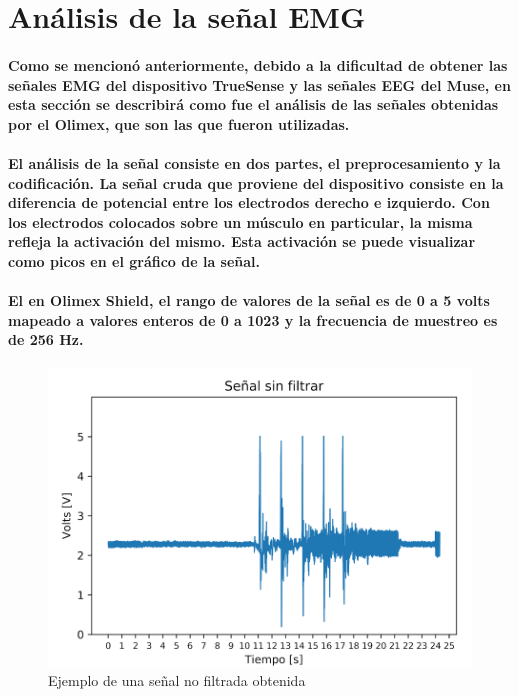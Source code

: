 \documentclass{article}
\begin{document}
\section{Análisis de la señal EMG}
\paragraph{
Como se mencionó anteriormente, debido a la dificultad de obtener las señales EMG del dispositivo TrueSense y las señales EEG del Muse, en esta sección se describirá como fue el análisis de las señales obtenidas por el Olimex, que son las que fueron utilizadas.
}
\paragraph{
El análisis de la señal consiste en dos partes, el preprocesamiento y la codificación. La señal cruda que proviene del dispositivo consiste en la diferencia de potencial entre los electrodos derecho e izquierdo. Con los electrodos colocados sobre un músculo en particular, la misma refleja la activación del mismo. Esta activación se puede visualizar como picos en el gráfico de la señal.
}
\paragraph{
El en Olimex Shield, el rango de valores de la señal es de 0 a 5 volts mapeado a valores enteros de 0 a 1023 y la frecuencia de muestreo es de 256 Hz.
}

\begin{figure}[ht]
    \centering
    \includegraphics[width=\textwidth]{no-filter.png}%
    \caption{Ejemplo de una señal no filtrada obtenida}
    \label{fig:no-filter}
\end{figure}
\end{document}
